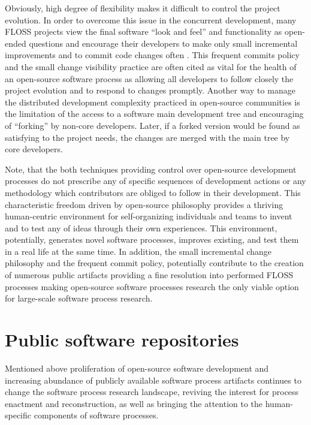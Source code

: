 Obviously, high degree of flexibility makes it difficult to control the project evolution. 
In order to overcome this issue in the concurrent development, many FLOSS projects view the final 
software ``look and feel'' and functionality as open-ended questions and encourage their developers to 
make only small incremental improvements and to commit code changes often 
\cite{so-checkin} \cite{git-best-practices1}. This frequent commits policy and the small change visibility 
practice are often cited as vital for the health of an open-source software process as allowing all developers 
to follow closely the project evolution and to respond to changes promptly.
Another way to manage the distributed development complexity practiced in open-source communities is the 
limitation of the access to a software main development tree and encouraging of ``forking'' by non-core developers. 
Later, if a forked version would be found as satisfying to the project needs, the changes are merged with the 
main tree by core developers.

Note, that the both techniques providing control over open-source development processes do not prescribe 
any of specific sequences of development actions or any methodology which contributors are obliged to follow 
in their development.
This characteristic freedom driven by open-source philosophy provides a thriving human-centric environment for 
self-organizing individuals and teams to invent and to test any of ideas through their own experiences. 
This environment, potentially, generates novel software processes, improves existing, and test them in a real life
at the same time. 
In addition, the small incremental change philosophy and the frequent commit policy, potentially contribute to the 
creation of numerous public artifacts providing a fine resolution into performed FLOSS processes making open-source 
software processes research the only viable option for large-scale software process research.


%
%
\section{Public software repositories}\label{section_public_repositories}
Mentioned above proliferation of open-source software development and increasing abundance of publicly available 
software process artifacts continues to change the software process research landscape,
reviving the interest for process enactment and reconstruction, as well as bringing the attention to the 
human-specific components of software processes. 

